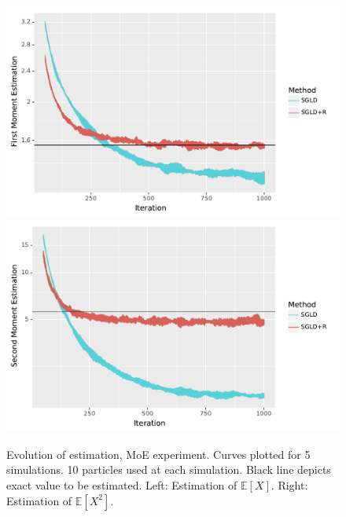 \begin{figure}[ht]
\begin{center}
\hspace{-0.5em}
  \includegraphics[width=\linewidth]{img/exp1_MOO}
\endminipage\hfill
{}
  \includegraphics[width=\linewidth]{img/exp2_MOO}
\endminipage
\end{center}
\caption{Evolution of estimation, MoE experiment. Curves plotted for 5 simulations. 10 particles used at each simulation. Black line depicts exact value to be estimated. Left: Estimation of $\mathbb{E}\left[X\right]$. Right: Estimation of $\mathbb{E}\left[X^2\right]$.} \label{fig:moe}
\end{figure}

